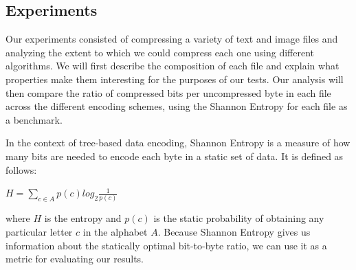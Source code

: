 \documentclass[twoside]{article}
\begin{document}
\begin{multicols}{2}
\section{Experiments}

Our experiments consisted of compressing a variety of text and image files and analyzing the extent to which we could compress each one using different algorithms. We will first describe the composition of each file and explain what properties make them interesting for the purposes of our tests. Our analysis will then compare the ratio of compressed bits per uncompressed byte in each file across the different encoding schemes, using the Shannon Entropy for each file as a benchmark.

In the context of tree-based data encoding, Shannon Entropy is a measure of how many bits are needed to encode each byte in a static set of data. It is defined as follows:
\begin{center}
$H = \sum_{c \in A}p(c) log_2 \frac{1}{p(c)}$
\end{center}
where $H$ is the entropy and $p(c)$ is the static probability of obtaining any particular letter $c$ in the alphabet $A$. Because Shannon Entropy gives us information about the statically optimal bit-to-byte ratio, we can use it as a metric for evaluating our results.


\end{multicols}
\end{document}
